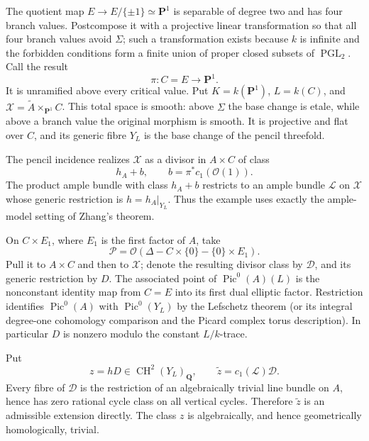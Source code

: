 \documentclass[11pt,a4paper]{article}
\begin{document}
The quotient map $E\to E/\{\pm1\}\simeq\mathbf P^1$ is separable
of degree two and has four branch values. Postcompose it with a
projective linear transformation so that all four branch values
avoid $\Sigma$; such a transformation exists because $k$ is
infinite and the forbidden conditions form a finite union of
proper closed subsets of $\operatorname{PGL}_2$. Call the result
\[
                   \pi:C=E\longrightarrow\mathbf P^1.
\]
It is unramified above every critical value. Put
$K=k(\mathbf P^1)$, $L=k(C)$, and
$\mathcal X=\widetilde A\times_{\mathbf P^1}C$.
This total space is smooth: above $\Sigma$ the base change is
etale, while above a branch value the original morphism is smooth.
It is projective and flat over $C$, and its generic fibre $Y_L$
is the base change of the pencil threefold.

The pencil incidence realizes $\mathcal X$ as a divisor in
$A\times C$ of class
\[
                        h_A+b,\qquad b=\pi^*c_1(\mathcal O(1)).
\]
The product ample bundle with class $h_A+b$ restricts to an ample
bundle $\mathcal L$ on $\mathcal X$ whose generic restriction is
$h=h_A|_{Y_L}$. Thus the example uses exactly the ample-model
setting of Zhang's theorem.

On $C\times E_1$, where $E_1$ is the first factor of $A$, take
\[
 \mathcal P=\mathcal O(\Delta-C\times\{0\}-\{0\}\times E_1).
\]
Pull it to $A\times C$ and then to $\mathcal X$; denote the
resulting divisor class by $\mathcal D$, and its generic
restriction by $D$. The associated point of
$\operatorname{Pic}^0(A)(L)$ is the nonconstant identity map from
$C=E$ into its first dual elliptic factor. Restriction identifies
$\operatorname{Pic}^0(A)$ with $\operatorname{Pic}^0(Y_L)$ by the
Lefschetz theorem (or its integral degree-one cohomology comparison
and the Picard complex torus description). In particular $D$ is
nonzero modulo the constant $L/k$-trace.

Put
\[
                z=hD\in\operatorname{CH}^2(Y_L)_{\mathbf Q},
       \qquad \widetilde z=c_1(\mathcal L)\mathcal D.
\]
Every fibre of $\mathcal D$ is the restriction of an algebraically
trivial line bundle on $A$, hence has zero rational cycle class on
all vertical cycles. Therefore $\widetilde z$ is an admissible
extension directly. The class $z$ is algebraically, and hence
geometrically homologically, trivial.
\end{document}
